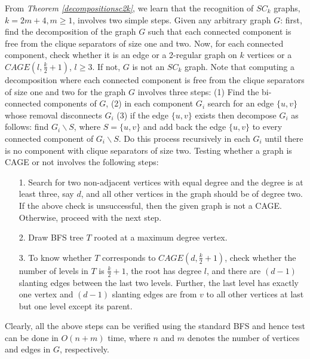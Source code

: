 \documentclass[runningheads]{llncs}
\begin{document}
\noindent From \emph{Theorem \ref{decompositionsc2k}}, we learn that the recognition of $SC_k$ graphs, $k = 2m+4, m \geq 1$, involves two simple steps. Given any arbitrary graph $G$: first, find the decomposition of the graph $G$ such that each connected component is free from the clique separators of size one and two. Now, for each connected component, check whether it is an edge or a 2-regular graph on $k$ vertices or a $CAGE(l, \frac{k}{2}+1)$, $l \geq 3$. If not, $G$ is not an $SC_k$ graph. Note that computing a decomposition where each connected component is free from the clique separators of size one and two for the graph $G$ involves three steps: (1) Find the bi-connected components of $G$, (2) in each component $G_i$ search for an edge $\{u,v\}$ whose removal disconnects $G_i$ (3) if the edge $ \{u,v\}$ exists then decompose $G_i$ as follows: find $G_i\backslash S$, where $S = \{u,v\}$ and add back the edge $\{u,v\}$ to every connected component of $G_i\backslash S$. Do this process recursively in each $G_i$ until there is no component with clique separators of size two. Testing whether a graph is CAGE or not involves the following steps:
\begin{itemize}
\item[1.] Search for two non-adjacent vertices with equal degree and the degree is at least three, say $d$, and all other vertices in the graph should be of degree two. If the above check is unsuccessful, then the given graph is not a CAGE. Otherwise, proceed with the next step. 
\item[2.] Draw BFS tree $T$ rooted at a maximum degree vertex.
\item[3.] To know whether $T$ corresponds to $CAGE(d, \frac{k}{2}+1)$, check whether the number of levels in $T$ is $\frac{k}{2}+1$, the root has degree $l$, and there are $(d-1)$ slanting edges between the last two levels. Further, the last level has exactly one vertex and $(d-1)$ slanting edges are from $v$ to all other vertices at last but one level except its parent. 
\end{itemize}

Clearly, all the above steps can be verified using the standard BFS and hence test can be done in $O(n+m)$ time, where $n$ and $m$ denotes the number of vertices and edges in $G$, respectively. 
\end{document}
